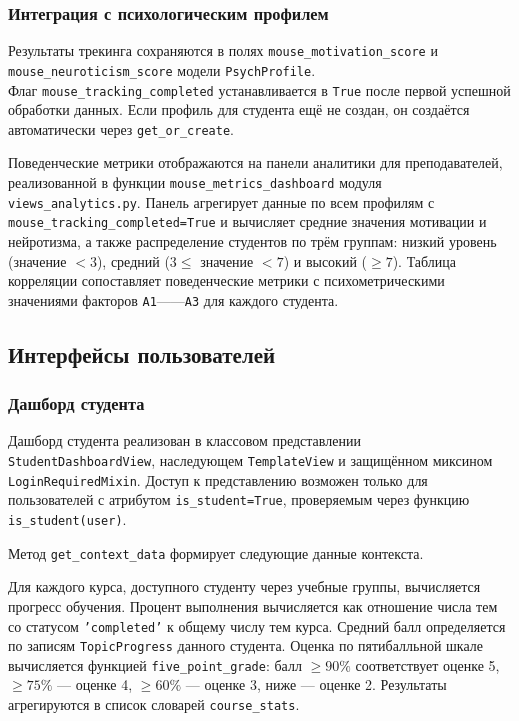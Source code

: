 \subsubsection{Интеграция с психологическим профилем}

Результаты трекинга сохраняются в полях \texttt{mouse\_motivation\_score} 
и \texttt{mouse\_neuroticism\_score} модели \texttt{PsychProfile}.\\ 
Флаг \texttt{mouse\_tracking\_completed} устанавливается в \texttt{True} 
после первой успешной обработки данных. Если профиль для студента 
ещё не создан, он создаётся автоматически через \texttt{get\_or\_create}.

Поведенческие метрики отображаются на панели аналитики для преподавателей, 
реализованной в функции \texttt{mouse\_metrics\_dashboard} модуля 
\texttt{views\_analytics.py}. Панель агрегирует данные по всем 
профилям с \texttt{mouse\_tracking\_completed=True} и вычисляет 
средние значения мотивации и нейротизма, а также распределение 
студентов по трём группам: низкий уровень (значение $<3$), средний 
($3 \leq$ значение $< 7$) и высокий ($\geq 7$). Таблица корреляции 
сопоставляет поведенческие метрики с психометрическими значениями 
факторов \texttt{A1}------\texttt{A3} для каждого студента.

\subsection{Интерфейсы пользователей}
\label{subsec:user_interfaces}

\subsubsection{Дашборд студента}

Дашборд студента реализован в классовом представлении\\ 
\texttt{StudentDashboardView}, наследующем \texttt{TemplateView} 
и защищённом миксином \texttt{LoginRequiredMixin}. Доступ 
к представлению возможен только для пользователей с атрибутом 
\texttt{is\_student=True}, проверяемым через функцию 
\texttt{is\_student(user)}.

Метод \texttt{get\_context\_data} формирует следующие данные контекста.

Для каждого курса, доступного студенту 
через учебные группы, вычисляется прогресс обучения. Процент 
выполнения вычисляется как отношение числа тем со статусом 
\texttt{'completed'} к общему числу тем курса. Средний балл 
определяется по записям \texttt{TopicProgress} данного студента. 
Оценка по пятибалльной шкале вычисляется функцией 
\texttt{five\_point\_grade}: балл $\geq 90\%$ соответствует оценке 5, 
$\geq 75\%$ --- оценке 4, $\geq 60\%$ --- оценке 3, ниже --- оценке 2. 
Результаты агрегируются в список словарей \texttt{course\_stats}.

